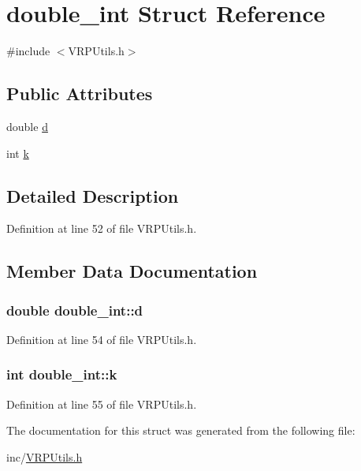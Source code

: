 \hypertarget{structdouble__int}{
\section{double\_\-int Struct Reference}
\label{structdouble__int}
}


{\ttfamily \#include $<$VRPUtils.h$>$}

\subsection*{Public Attributes}
\begin{DoxyCompactItemize}
\item 
double \hyperlink{structdouble__int_ace87c6d3ff1f31ea35f0e64e54a4af97}{d}
\item 
int \hyperlink{structdouble__int_a9e51e8de59b0c137ddd05f8610da0fe5}{k}
\end{DoxyCompactItemize}


\subsection{Detailed Description}


Definition at line 52 of file VRPUtils.h.



\subsection{Member Data Documentation}
\hypertarget{structdouble__int_ace87c6d3ff1f31ea35f0e64e54a4af97}{
\subsubsection[{d}]{\setlength{\rightskip}{0pt plus 5cm}double {\bf double\_\-int::d}}}
\label{structdouble__int_ace87c6d3ff1f31ea35f0e64e54a4af97}


Definition at line 54 of file VRPUtils.h.

\hypertarget{structdouble__int_a9e51e8de59b0c137ddd05f8610da0fe5}{
\subsubsection[{k}]{\setlength{\rightskip}{0pt plus 5cm}int {\bf double\_\-int::k}}}
\label{structdouble__int_a9e51e8de59b0c137ddd05f8610da0fe5}


Definition at line 55 of file VRPUtils.h.



The documentation for this struct was generated from the following file:\begin{DoxyCompactItemize}
\item 
inc/\hyperlink{_v_r_p_utils_8h}{VRPUtils.h}\end{DoxyCompactItemize}
